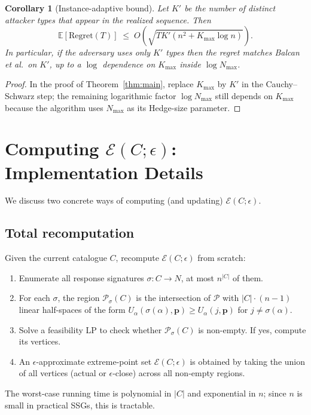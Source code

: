 \documentclass[11pt]{article}
\newtheorem{corollary}{Corollary}
\newcommand{\pvec}{\mathbf{p}}
\newcommand{\cE}{\mathcal{E}}
\newcommand{\cP}{\mathcal{P}}
\newcommand{\EE}{\mathbb{E}}
\newcommand{\Kmax}{K_{\max}}
\begin{document}
\begin{corollary}[Instance-adaptive bound]\label{cor:adaptive}
Let $K'$ be the number of distinct attacker types that appear in the realized sequence. Then
\[
\EE[\mathrm{Regret}(T)] \;\le\; O\!\left(\sqrt{T K' (n^2 + \Kmax \log n)}\right).
\]
In particular, if the adversary uses only $K'$ types then the regret matches Balcan et al.\ \emph{on $K'$}, up to a $\log$ dependence on $\Kmax$ inside $\log N_{\max}$.
\end{corollary}

\begin{proof}
In the proof of Theorem~\ref{thm:main}, replace $\Kmax$ by $K'$ in the Cauchy--Schwarz step; the remaining logarithmic factor $\log N_{\max}$ still depends on $\Kmax$ because the algorithm uses $N_{\max}$ as its Hedge-size parameter.
\end{proof}

\section{Computing $\cE(C;\epsilon)$: Implementation Details}
\label{sec:impl}

We discuss two concrete ways of computing (and updating) $\cE(C;\epsilon)$.

\subsection{Total recomputation}

Given the current catalogue $C$, recompute $\cE(C;\epsilon)$ from scratch:
\begin{enumerate}[leftmargin=*]
  \item Enumerate all response signatures $\sigma : C \to N$, at most $n^{|C|}$ of them.
  \item For each $\sigma$, the region $\cP_\sigma(C)$ is the intersection of $\cP$ with $|C|\cdot(n-1)$ linear half-spaces of the form $U_\alpha(\sigma(\alpha),\pvec) \ge U_\alpha(j,\pvec)$ for $j\ne\sigma(\alpha)$.
  \item Solve a feasibility LP to check whether $\cP_\sigma(C)$ is non-empty. If yes, compute its vertices.
  \item An $\epsilon$-approximate extreme-point set $\cE(C;\epsilon)$ is obtained by taking the union of all vertices (actual or $\epsilon$-close) across all non-empty regions.
\end{enumerate}
The worst-case running time is polynomial in $|C|$ and exponential in $n$; since $n$ is small in practical SSGs, this is tractable.
\end{document}
